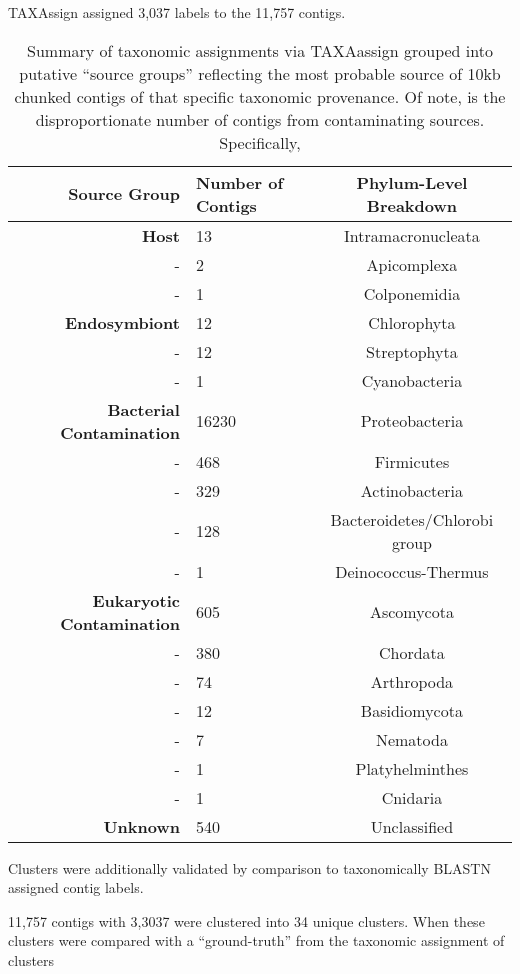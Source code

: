 TAXAssign assigned 3,037 labels to the 11,757 contigs. 
\begin{table}
	\begin{tabular}{r | l c |}
\textbf{Source Group} & \textbf{Number of Contigs} & \textbf{Phylum-Level Breakdown} \\
\hline
\textbf{Host} & 13 & Intramacronucleata\\
- & 2  & Apicomplexa\\
- & 1  & Colponemidia \\
\hline 
\textbf{Endosymbiont} & 12 & Chlorophyta\\
- &  12 & Streptophyta\\
- &  1 & Cyanobacteria\\
\hline
\textbf{Bacterial Contamination} & 16230 & Proteobacteria \\
- & 468 & Firmicutes\\
- & 329 & Actinobacteria\\
- & 128 & Bacteroidetes/Chlorobi group\\
- & 1 & Deinococcus-Thermus\\
\hline
\textbf{Eukaryotic Contamination} & 605 & Ascomycota \\
 - & 380 & Chordata\\
 - & 74 & Arthropoda \\
 - & 12 & Basidiomycota\\
- & 7  & Nematoda \\
- & 1 & Platyhelminthes\\
- & 1 & Cnidaria\\
\hline
\textbf{Unknown} & 540 & Unclassified \\
\hline
	\end{tabular}
	\caption{Summary of taxonomic assignments via TAXAassign grouped into putative ``source groups'' reflecting
		the most probable source of 10kb chunked contigs of that specific taxonomic provenance.  Of note, is the disproportionate
		number of contigs from contaminating sources. Specifically, }
	\label{}
\end{table}


    

Clusters were additionally validated by comparison to taxonomically BLASTN
assigned contig labels.    

11,757 contigs with 3,3037 were clustered into 34 unique clusters.
When these clusters were compared with a ``ground-truth'' from
the taxonomic assignment of clusters 

